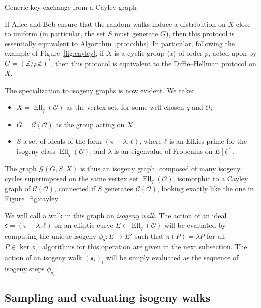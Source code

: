 \documentclass{article}
\newcommand{\Cl}{\mathcal{C}}
\newcommand{\Graph}{\mathcal{G}}
\renewcommand{\O}{\mathcal{O}}
\renewcommand{\frak}{\mathfrak}
\theoremstyle{definition}
\DeclareMathOperator{\Ell}{Ell}
\begin{document}
\begin{algorithm}
  \caption{Generic key exchange from a Cayley graph}
  \label{proto:cayley}
\end{algorithm}

If Alice and Bob ensure that the random walks induce a distribution on
$X$ close to uniform (in particular, the set $S$ must generate $G$),
then this protocol is essentially equivalent to
Algorithm~\ref{proto:hhs}. In particular, following the example of
Figure~\ref{fig:cayley}, if $X$ is a cyclic group $〈x〉$ of order
$p$, acted upon by $G=(ℤ/pℤ)^*$, then this protocol is equivalent to
the Diffie--Hellman protocol on $X$.

The specialization to isogeny graphs is now evident. We take:
\begin{itemize}
\item $X=\Ell_q(\O)$ as the vertex set, for some well-chosen $q$ and $\O$;
\item $G=\Cl(\O)$ as the group acting on $X$;
\item $S$ a set of ideals of the form $(π-λ,ℓ)$, where $ℓ$ is an
  Elkies prime for the isogeny class $\Ell_q(\O)$,
  and $λ$ is an eigenvalue of Frobenius on $E[ℓ]$. 
\end{itemize}
The graph $\Graph(G,S,X)$ is thus an isogeny graph, composed of many
isogeny cycles superimposed on the same vertex set $\Ell_q(\O)$,
isomorphic to a Cayley graph of $\Cl(\O)$, connected if $S$ generates
$\Cl(\O)$, looking exactly like the one in Figure~\ref{fig:cayley}.

We will call a walk in this graph an \emph{isogeny walk}. The action of
an ideal $\frak s=(π-λ,ℓ)$ on an elliptic curve $E∈\Ell_q(\O)$ will be
evaluated by computing the unique isogeny $ϕ_{\frak s}:E→E'$ such that
$π(P)=λP$ for all $P∈\ker ϕ_{\frak s}$; algorithms for this operation are given
in the next subsection. The action of an isogeny walk $(\frak s_i)_i$
will be simply evaluated as the sequence of isogeny steps
$ϕ_{\frak s_i}$.


\subsection{Sampling and evaluating isogeny walks}
\end{document}
